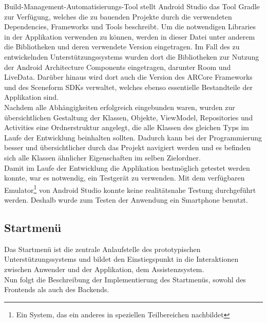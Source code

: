 Build-Management-Automatisierungs-Tool stellt Android Studio das Tool Gradle zur Verfügung, welches die zu bauenden Projekte durch die verwendeten 
Dependencies, Frameworks und Tools beschreibt. Um die notwendigen Libraries in der Applikation verwenden zu können, werden in dieser Datei unter 
anderem die Bibliotheken und deren verwendete Version eingetragen. Im Fall des zu entwickelnden Unterstützungssystems wurden dort die Bibliotheken zur 
Nutzung der Android Architecture Components eingetragen, darunter Room und LiveData. 
Darüber hinaus wird dort auch die Version des ARCore Frameworks und des Sceneform \acs{SDK}s verwaltet, welches ebenso essentielle Bestandteile der 
Applikation sind.
\\ 
Nachdem alle Abhängigkeiten erfolgreich eingebunden waren, wurden zur übersichtlichen Gestaltung der Klassen, Objekte, ViewModel, Repositories und Activities 
eine Ordnerstruktur angelegt, die alle Klassen des gleichen Typs im Laufe der Entwicklung beinhalten sollten. Dadurch kann bei der Programmierung besser und 
übersichtlicher durch das Projekt navigiert werden und  es befinden sich alle Klassen ähnlicher Eigenschaften im selben Zielordner. 
\\ 
\linebreak
Damit im Laufe der Entwicklung die Applikation bestmöglich getestet werden konnte, war es notwendig, ein Testgerät zu verwenden. Mit dem verfügbaren 
Emulator\footnote{Ein System, das ein anderes in speziellen Teilbereichen nachbildet} von Android Studio konnte keine realitätsnahe Testung 
durchgeführt werden. Deshalb wurde zum Testen der Anwendung ein Smartphone benutzt.%
\subsection{Startmenü}
Das Startmenü ist die zentrale Anlaufstelle des prototypischen Unterstützungssystems und bildet den Einstiegspunkt in die Interaktionen zwischen Anwender 
und der Applikation, dem Assistenzsystem.
\\ 
Nun folgt die Beschreibung der Implementierung des Startmenüs, sowohl des Frontends als auch des Backends.

